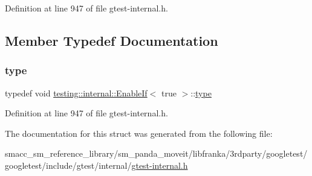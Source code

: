 Definition at line 947 of file gtest-\/internal.\+h.



\subsection{Member Typedef Documentation}
\mbox{\label{structtesting_1_1internal_1_1EnableIf_3_01true_01_4_a9398d803f1fdd99ff41823746f6299ff}} 
\subsubsection{\texorpdfstring{type}{type}}
{\footnotesize\ttfamily typedef void \hyperlink{structtesting_1_1internal_1_1EnableIf}{testing\+::internal\+::\+Enable\+If}$<$ true $>$\+::\hyperlink{structtesting_1_1internal_1_1EnableIf_3_01true_01_4_a9398d803f1fdd99ff41823746f6299ff}{type}}



Definition at line 947 of file gtest-\/internal.\+h.



The documentation for this struct was generated from the following file\+:\begin{DoxyCompactItemize}
\item 
smacc\+\_\+sm\+\_\+reference\+\_\+library/sm\+\_\+panda\+\_\+moveit/libfranka/3rdparty/googletest/googletest/include/gtest/internal/\hyperlink{gtest-internal_8h}{gtest-\/internal.\+h}\end{DoxyCompactItemize}
